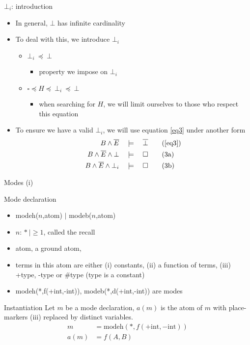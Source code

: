 \begin{frame}{$\bot_i$: introduction}

\begin{itemize}
    \item In general, $\bot$ has infinite cardinality
    \item To deal with this, we introduce $\bot_i$
    \begin{itemize}
        \item $\bot_i \ \preceq \ \bot$ 
        \begin{itemize}
            \item[\ding{43}] property we impose on $\bot_i$
        \end{itemize}
        \item $\square \preceq H \preceq \ \bot_i \ \preceq \ \bot $
        \begin{itemize}
            \item[\ding{43}] when searching for $H$, we will limit ourselves to those who respect this equation
        \end{itemize}
    \end{itemize}
    \item To ensure we have a valid $\bot_i$, we will use equation \ref{eq3} under another form
\begin{align}
B \land \overline{E} \quad &\models \quad \overline{\bot} \tag{\ref{eq3}} \\
B \land \overline{E} \land \bot \quad &\models \quad \square \tag{3a} \\
B \land \overline{E} \land \bot_i \quad &\models \quad \square \tag{3b}
\end{align}
\end{itemize}
    
\end{frame}

\begin{frame}{Modes (i)}
\begin{block}{Mode declaration}
\begin{itemize}
    \item modeh($n$,atom) $|$ modeb($n$,atom)
    \item $n$: $ * \ | \geq 1$, called the recall
    \item atom, a ground atom,
    \item terms in this atom are either (i) constants, (ii) a function of terms, (iii) +type, -type or \#type (type is a constant)
    \item modeh(*,f(+int,-int)), modeb(*,d(+int,-int)) are modes
\end{itemize}
\end{block}    
\begin{block}{Instantiation}
Let $m$ be a mode declaration, $a(m)$ is the atom of $m$ with place-markers (iii) replaced by distinct variables.
\begin{align*}
m &= \text{modeh}(*,f(+\text{int},-\text{int})) \\
a(m) &= f(A,B)
\end{align*}
\end{block}
\end{frame}


